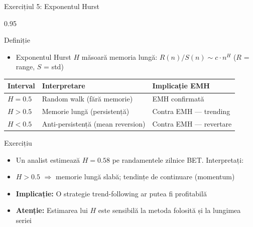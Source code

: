 \documentclass[9pt, aspectratio=169, t]{beamer}
\begin{document}
\begin{frame}{Exercițiul 5: Exponentul Hurst}
    \begin{cminipage}{0.95\textwidth}
\begin{block}{Definiție}
\begin{itemize}\setlength{\itemsep}{0pt}
    \item Exponentul Hurst $H$ măsoară memoria lungă: $R(n)/S(n) \sim c \cdot n^H$ ($R$ = range, $S$ = std)
\end{itemize}
\end{block}

\renewcommand{\arraystretch}{1.1}
\begin{center}
\footnotesize
\begin{tabular}{lll}
\toprule
\textbf{Interval} & \textbf{Interpretare} & \textbf{Implicație EMH} \\
\midrule
$H = 0.5$ & Random walk (fără memorie) & EMH confirmată \\
$H > 0.5$ & Memorie lungă (persistență) & Contra EMH --- trending \\
$H < 0.5$ & Anti-persistență (mean reversion) & Contra EMH --- revertare \\
\bottomrule
\end{tabular}
\end{center}

\begin{exampleblock}{Exercițiu}
\small
\begin{itemize}\setlength{\itemsep}{0pt}
    \item Un analist estimează $H = 0.58$ pe randamentele zilnice BET. Interpretați:
    \item $H > 0.5$ $\Rightarrow$ memorie lungă slabă; tendințe de continuare (momentum)
    \item \textbf{Implicație:} O strategie trend-following ar putea fi profitabilă
    \item \textbf{Atenție:} Estimarea lui $H$ este sensibilă la metoda folosită și la lungimea seriei
\end{itemize}
\end{exampleblock}
    \end{cminipage}
\end{frame}
\end{document}

